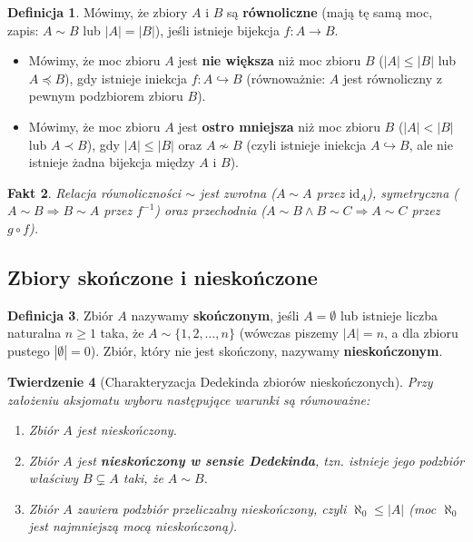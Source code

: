\documentclass[11pt, a4paper]{article}
\theoremstyle{definition}
\newtheorem{definicja}{Definicja}[section]
\theoremstyle{plain}
\newtheorem{twierdzenie}[definicja]{Twierdzenie}
\newtheorem{fakt}[definicja]{Fakt}
\theoremstyle{remark}
\begin{document}
\begin{definicja}
Mówimy, że zbiory $A$ i $B$ są \textbf{równoliczne} (mają tę samą moc, zapis: $A \sim B$ lub $|A| = |B|$), jeśli istnieje bijekcja $f : A \to B$.
\begin{itemize}
    \item Mówimy, że moc zbioru $A$ jest \textbf{nie większa} niż moc zbioru $B$ ($|A| \le |B|$ lub $A \preceq B$), gdy istnieje iniekcja $f : A \hookrightarrow B$ (równoważnie: $A$ jest równoliczny z pewnym podzbiorem zbioru $B$).
    \item Mówimy, że moc zbioru $A$ jest \textbf{ostro mniejsza} niż moc zbioru $B$ ($|A| < |B|$ lub $A \prec B$), gdy $|A| \le |B|$ oraz $A \nsim B$ (czyli istnieje iniekcja $A \hookrightarrow B$, ale nie istnieje żadna bijekcja między $A$ i $B$).
\end{itemize}
\end{definicja}

\begin{fakt}
Relacja równoliczności $\sim$ jest zwrotna ($A \sim A$ przez $\mathrm{id}_A$), symetryczna ($A \sim B \Rightarrow B \sim A$ przez $f^{-1}$) oraz przechodnia ($A \sim B \land B \sim C \Rightarrow A \sim C$ przez $g \circ f$).
\end{fakt}

\subsection{Zbiory skończone i nieskończone}

\begin{definicja}
Zbiór $A$ nazywamy \textbf{skończonym}, jeśli $A = \emptyset$ lub istnieje liczba naturalna $n \ge 1$ taka, że $A \sim \{1, 2, \dots, n\}$ (wówczas piszemy $|A| = n$, a dla zbioru pustego $|\emptyset| = 0$). Zbiór, który nie jest skończony, nazywamy \textbf{nieskończonym}.
\end{definicja}

\begin{twierdzenie}[Charakteryzacja Dedekinda zbiorów nieskończonych]
Przy założeniu aksjomatu wyboru następujące warunki są równoważne:
\begin{enumerate}
    \item Zbiór $A$ jest nieskończony.
    \item Zbiór $A$ jest \textbf{nieskończony w sensie Dedekinda}, tzn. istnieje jego podzbiór właściwy $B \subsetneq A$ taki, że $A \sim B$.
    \item Zbiór $A$ zawiera podzbiór przeliczalny nieskończony, czyli $\aleph_0 \le |A|$ (moc $\aleph_0$ jest najmniejszą mocą nieskończoną).
\end{enumerate}
\end{twierdzenie}
\end{document}
